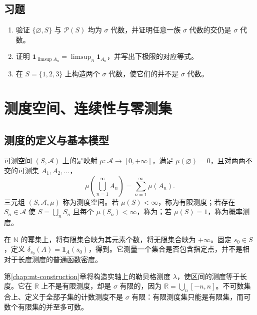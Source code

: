 \documentclass[UTF8,12pt,a4paper,fontset=fandol]{ctexbook}
\begin{document}
\section{习题}
\begin{enumerate}
 \item 验证 $\{\varnothing,S\}$ 与 $\mathcal P(S)$ 均为 $\sigma$ 代数，并证明任意一族 $\sigma$ 代数的交仍是 $\sigma$ 代数。
 \item 证明 $\mathbf1_{\limsup A_n}=\limsup_n\mathbf1_{A_n}$，并写出下极限的对应等式。
 \item 在 $S=\{1,2,3\}$ 上构造两个 $\sigma$ 代数，使它们的并不是 $\sigma$ 代数。
\end{enumerate}

\chapter{测度空间、连续性与零测集}
\label{chap:mt-measures}

\section{测度的定义与基本模型}
\begin{definition}
可测空间 $(S,\mathcal A)$ 上的是映射 $\mu:\mathcal A\to[0,+\infty]$，满足 $\mu(\varnothing)=0$，且对两两不交的可测集 $A_1,A_2,\ldots$，
\begin{equation}
 \mu\!\left(\bigcup_{n=1}^{\infty}A_n\right)=\sum_{n=1}^{\infty}\mu(A_n).
 \label{eq:mt-countable-additivity}
\end{equation}
三元组 $(S,\mathcal A,\mu)$ 称为测度空间。若 $\mu(S)<\infty$，称为有限测度；若存在 $S_n\in\mathcal A$ 使 $S=\bigcup_nS_n$ 且每个 $\mu(S_n)<\infty$，称为；若 $\mu(S)=1$，称为概率测度。
\end{definition}

在 $\mathbb N$ 的幂集上，将有限集合映为其元素个数，将无限集合映为 $+\infty$。固定 $s_0\in S$，定义 $\delta_{s_0}(A)=\mathbf1_A(s_0)$，得到。它测量一个集合是否包含指定点，并不是相对于长度测度的普通函数密度。

第\ref{chap:mt-construction}章将构造实轴上的勒贝格测度 $\lambda$，使区间的测度等于长度。它在 $\mathbb R$ 上不是有限测度，却是 $\sigma$ 有限的，因为 $\mathbb R=\bigcup_n[-n,n]$。不可数集合上、定义于全部子集的计数测度不是 $\sigma$ 有限：有限测度集只能是有限集，而可数个有限集的并至多可数。
\end{document}
